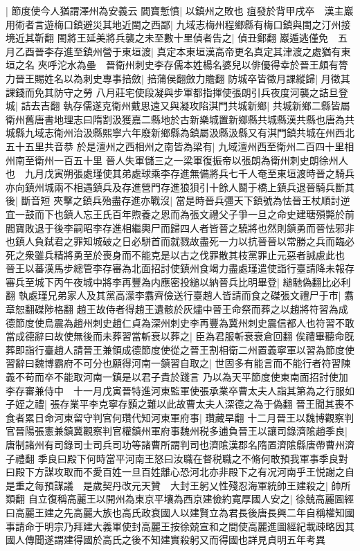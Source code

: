 |{
	節度使今人猶謂澤州為安義云}
閻寶慙憤|{
	以鎮州之敗也}
疽發於背甲戌卒　漢主巖用術者言遊梅口鎮避災其地近閩之西鄙|{
	九域志梅州程鄉縣有梅口鎮與閩之汀州接境近其靳翻}
閩將王延美將兵襲之未至數十里偵者告之|{
	偵丑鄭翻}
巖遁逃僅免　五月乙酉晉李存進至鎮州營于東垣渡|{
	真定本東垣漢高帝更名真定其津渡之處猶有東垣之名}
夾呼沱水為壘　晉衛州刺史李存儒本姓楊名婆兒以俳優得幸於晉王頗有膂力晉王賜姓名以為刺史專事掊斂|{
	掊蒲侯翻斂力贍翻}
防城卒皆徵月課縱歸|{
	月徵其課錢而免其防守之勞}
八月莊宅使段凝與步軍都指揮使張朗引兵夜度河襲之詰旦登城|{
	詰去吉翻}
執存儒遂克衛州戴思遠又與凝攻陷淇門共城新鄉|{
	共城新鄉二縣皆屬衛州舊唐書地理志曰隋割汲獲嘉二縣地於古新樂城置新鄉縣共城縣漢共縣也唐為共城縣九域志衛州治汲縣熙寧六年廢新鄉縣為鎮屬汲縣汲縣又有淇門鎮共城在州西北五十五里共音恭}
於是澶州之西相州之南皆為梁有|{
	九域澶州西至衛州二百四十里相州南至衛州一百五十里}
晉人失軍儲三之一梁軍復振帝以張朗為衛州刺史朗徐州人也　九月戊寅朔張處瑾使其弟處球乘李存進無備將兵七千人奄至東垣渡時晉之騎兵亦向鎮州城兩不相遇鎮兵及存進營門存進狼狽引十餘人鬬于橋上鎮兵退晉騎兵斷其後|{
	斷音短}
夾擊之鎮兵殆盡存進亦戰沒|{
	當是時晉兵彊天下鎮號為怯晉王杖順討逆宜一鼓而下也鎮人忘王氏百年煦養之恩而為張文禮父子爭一旦之命史建瑭殞斃於前閻寶敗退于後李嗣昭李存進相繼輿尸而歸四人者皆晉之驍將也然則鎮勇而晉怯邪非也鎮人負弑君之罪知城破之日必駢首而就戮故盡死一力以抗晉晉以常勝之兵而臨必死之衆雖兵精將勇至於喪身而不能克是以古之伐罪散其枝黨罪止元惡者誠慮此也}
晉王以蕃漢馬步總管李存審為北面招討使鎮州食竭力盡處瑾遣使詣行臺請降未報存審兵至城下丙午夜城中將李再豐為内應密投縋以納晉兵比明畢登|{
	縋馳偽翻比必利翻}
執處瑾兄弟家人及其黨高濛李翥齊儉送行臺趙人皆請而食之磔張文禮尸于市|{
	翥章恕翻磔陟格翻}
趙王故侍者得趙王遺骸於灰燼中晉王命祭而葬之以趙將符習為成德節度使烏震為趙州刺史趙仁貞為深州刺史李再豐為冀州刺史震信都人也符習不敢當成德辭曰故使無後而未葬習當斬衰以葬之|{
	臣為君服斬衰衰倉回翻}
俟禮畢聽命旣葬即詣行臺趙人請晉王兼領成德節度使從之晉王割相衛二州置義寧軍以習為節度使習辭曰魏博霸府不可分也願得河南一鎮習自取之|{
	世固多有能言而不能行者符習陳義不苟而卒不能取河南一鎮是以君子貴於踐言}
乃以為天平節度使東南面招討使加李存審兼侍中　十一月戊寅晉特進河東監軍使張承業卒曹太夫人詣其第為之行服如子姪之禮|{
	張存業平李克寧存顥之難以此故曹太夫人深德之為于偽翻}
晉王聞其喪不食者累日命河東留守判官何瓚代知河東軍府事|{
	瓚藏旱翻}
十二月晉王以魏博觀察判官晉陽張憲兼鎮冀觀察判官權鎮州軍府事魏州税多逋負晉王以讓司錄濟隂趙季良|{
	唐制諸州有司錄司士司兵司功等諸曹所謂判司也濟隂漢郡名隋置濟隂縣唐帶曹州濟子禮翻}
季良曰殿下何時當平河南王怒曰汝職在督税職之不脩何敢預我軍事季良對曰殿下方謀攻取而不愛百姓一旦百姓離心恐河北亦非殿下之有况河南乎王悦謝之自是重之每預謀議　是歲契丹改元天贊　大封王躬乂性殘忍海軍統帥王建殺之|{
	帥所類翻}
自立復稱高麗王以開州為東京平壤為西京建儉約寛厚國人安之|{
	徐兢高麗圖經曰高麗王建之先高麗大族也高氏政衰國人以建賢立為君長後唐長興二年自稱權知國事請命于明宗乃拜建大義軍使封高麗王按徐兢宣和之間使高麗進圖經紀載疎略因其國人傳聞遂謂建得國於高氏之後不知建實殺躬又而得國也詳見貞明五年考異}


